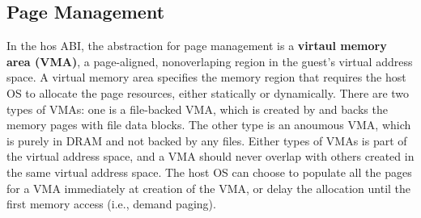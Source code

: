 \subsection{Page Management}
\label{sec:abi:memory}




In the hos ABI, the abstraction for page management
is a {\bf virtaul memory area (VMA)}, a page-aligned, nonoverlaping region
in the guest's virtual address space.
A virtual memory area
specifies the memory region that requires the host OS to allocate the page resources,
either statically or dynamically.
There are two types of VMAs: one is a file-backed VMA, which is created by  and backs the memory pages with file data blocks.
The other type is an anoumous VMA, which is purely in DRAM and not backed by any files.
Either types of VMAs is part of the virtual address space,
and a VMA should never overlap with others created in the same virtual address space.
The host OS can choose to populate all the pages for a VMA immediately at creation of the VMA,
or delay the allocation until the first memory access (i.e., demand paging).











